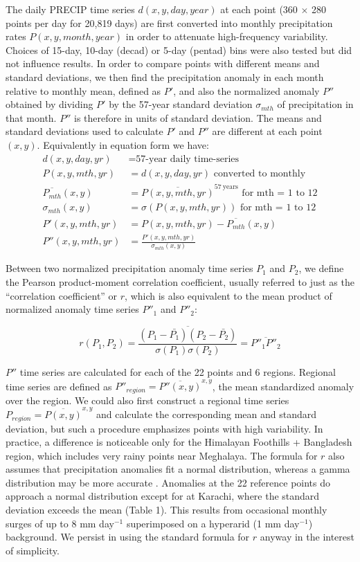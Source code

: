 \documentclass[12pt]{article}
\begin{document}
The daily PRECIP time series $d(x,y,day,year)$ at each point (360 $\times$ 280 points per day for 20,819 days) are first converted into monthly precipitation rates $P(x,y,month,year)$ in order to attenuate high-frequency variability. Choices of 15-day, 10-day (decad) or 5-day (pentad) bins were also tested but did not influence results. In order to compare points with different means and standard deviations, we then find the precipitation anomaly in each month relative to monthly mean, defined as $P'$, and also the normalized anomaly $P''$ obtained by dividing $P'$ by the 57-year standard deviation $\sigma_{mth}$ of precipitation in that month. $P''$ is therefore in units of standard deviation. The means and standard deviations used to calculate $P'$ and $P''$ are different at each point $(x,y)$. Equivalently in equation form we have:
\begin{align*}  
	d(x,y,day,yr)& = \text{57-year daily time-series} \\
	P(x,y,mth,yr) & =d(x,y,day,yr) \text{ converted to monthly} \\
	\overline{P_{mth}}(x,y) & = \overline{P(x,y,mth,yr)}^{\mathrm{57\ years}} \text{ for mth = 1 to 12}  \\
	\sigma_{mth}(x,y)& = \sigma(P(x,y,mth,yr)) \text{ for mth = 1 to 12} \\
	P'(x,y,mth,yr)& =P(x,y,mth,yr)-\overline{P_{mth}}(x,y) \\
	P''(x,y,mth,yr)& =\frac{P'(x,y,mth,yr)}{\sigma_{mth}(x,y)}
\end{align*}   

Between two normalized precipitation anomaly time series $P_1$ and $P_2$, we define the Pearson product-moment correlation coefficient, usually referred to just as the ``correlation coefficient'' or $r$, which is also equivalent to the mean product of normalized anomaly time series $P''_1$ and $P''_2$:

\begin{displaymath}
	r(P_1,P_2)=\frac{\overline{\left(P_1-\bar{P_1}\right)\left(P_2-\bar{P_2}\right)}}{\sigma\left(P_1\right)\sigma\left(P_2\right)}=\overline{P''_1P''_2}
\end{displaymath}
   
$P''$ time series are calculated for each of the 22 points and 6 regions. Regional time series are defined as $P''_{region}=\overline{P''(x,y)}^{x,y}$, the mean standardized anomaly over the region. We could also first construct a regional time series $P_{region}=\overline{P(x,y)}^{x,y}$ and calculate the corresponding mean and standard deviation, but such a procedure emphasizes points with high variability. In practice, a difference is noticeable only for the Himalayan Foothills + Bangladesh region, which includes very rainy points near Meghalaya. The formula for $r$ also assumes that precipitation anomalies fit a normal distribution, whereas a gamma distribution may be more accurate \citep{Aksoy1999}. Anomalies at the 22 reference points do approach a normal distribution except for at Karachi, where the standard deviation exceeds the mean (Table 1). This results from occasional monthly surges of up to 8 mm day$^{-1}$ superimposed on a hyperarid (1 mm day$^{-1}$) background. We persist in using the standard formula for $r$ anyway in the interest of simplicity.
\end{document}
